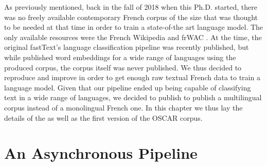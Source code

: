 As previously mentioned, back in the fall of 2018 when this Ph.D. started, there was no freely available contemporary French corpus of the size that was thought to be needed at that time in order to train a state-of-the art language model. The only available resources were the French Wikipedia and frWAC \citep{baroni-etal-2009-the}. At the time, the original fastText's language classification pipeline \citep{grave-etal-2018-learning} was recently published, but while \citet{grave-etal-2018-learning} published word embeddings for a wide range of languages using the produced corpus, the corpus itself was never published. We thus decided to reproduce and improve \citet{grave-etal-2018-learning} in order to get enough raw textual French data to train a language model. Given that our pipeline ended up being capable of classifying text in a wide range of languages, we decided to publish to publish a multilingual corpus instead of a monolingual French one. In this chapter we thus lay the details of the \goclassy as well as the first version of the OSCAR corpus. 


\section{An Asynchronous Pipeline}

